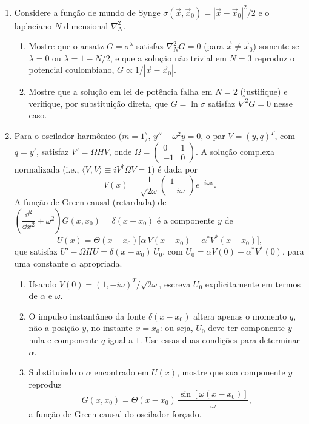 \begin{enumerate}
	\item Considere a função de mundo de Synge $\sigma(\vec x,\vec x_0) =
	      |\vec x-\vec x_0|^2/2$ e o laplaciano $N$-dimensional $\nabla_N^2$.
	      \begin{enumerate}
		      \item Mostre que o ansatz $G = \sigma^\lambda$ satisfaz
		            $\nabla_N^2 G = 0$ (para $\vec x\neq\vec x_0$) somente se
		            $\lambda=0$ ou $\lambda = 1-N/2$, e que a solução não trivial
		            em $N=3$ reproduz o potencial coulombiano,
		            $G\propto 1/|\vec x-\vec x_0|$.
		      \item Mostre que a solução em lei de potência falha em $N=2$
		            (justifique) e verifique, por substituição direta, que
		            $G = \ln\sigma$ satisfaz $\nabla^2 G = 0$ nesse caso.
	      \end{enumerate}

	\item Para o oscilador harmônico ($m=1$), $y''+\omega^2y=0$, o par
	      $V=(y,q)^T$, com $q=y'$, satisfaz $V'=\Omega H V$, onde
	      $\Omega=\begin{pmatrix}0&1\\-1&0\end{pmatrix}$. A solução complexa
	      normalizada (i.e., $\langle V,V\rangle\equiv iV^\dagger\Omega V=1$)
	      é dada por
	      $$
		      V(x) = \frac{1}{\sqrt{2\omega}}\begin{pmatrix}1\\-i\omega\end{pmatrix} e^{-i\omega x}.
	      $$
	      A função de Green causal (retardada) de
	      $\left(\dfrac{\dd^2}{\dd x^2}+\omega^2\right)G(x,x_0)=\delta(x-x_0)$
	      é a componente $y$ de
	      $$
		      U(x) = \Theta(x-x_0)\big[\alpha\, V(x-x_0) + \alpha^* V^*(x-x_0)\big],
	      $$
	      que satisfaz $U'-\Omega H U = \delta(x-x_0)\, U_0$, com
	      $U_0 = \alpha V(0) + \alpha^* V^*(0)$, para uma constante $\alpha$
	      apropriada.
	      \begin{enumerate}
		      \item Usando $V(0) = (1,-i\omega)^T/\sqrt{2\omega}$, escreva
		            $U_0$ explicitamente em termos de $\alpha$ e $\omega$.
		      \item O impulso instantâneo da fonte $\delta(x-x_0)$ altera
		            apenas o momento $q$, não a posição $y$, no instante
		            $x=x_0$: ou seja, $U_0$ deve ter componente $y$ nula e
		            componente $q$ igual a $1$. Use essas duas condições para
		            determinar $\alpha$.
		      \item Substituindo o $\alpha$ encontrado em $U(x)$, mostre que
		            sua componente $y$ reproduz
		            $$
			            G(x,x_0) = \Theta(x-x_0)\, \frac{\sin[\omega(x-x_0)]}{\omega},
		            $$
		            a função de Green causal do oscilador forçado.
	      \end{enumerate}

\end{enumerate}


